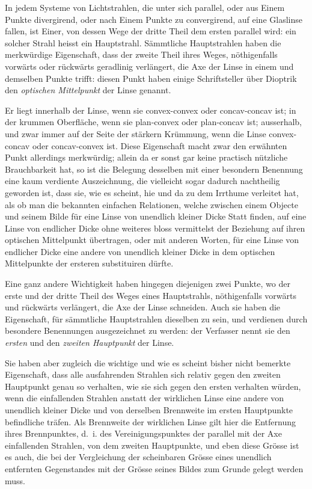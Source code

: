 \documentclass[12pt,a4paper]{article}
\begin{document}
In jedem Systeme von Lichtstrahlen, die unter sich parallel, oder aus Einem Punkte divergirend, oder nach Einem Punkte zu convergirend, auf eine Glaslinse fallen, ist Einer, von dessen Wege der dritte Theil dem ersten parallel wird: ein solcher Strahl heisst ein Hauptstrahl. Sämmtliche Hauptstrahlen haben die merkwürdige Eigenschaft, dass der zweite Theil ihres Weges, nöthigenfalls vorwärts oder rückwärts geradlinig verlängert, die Axe der Linse in einem und demselben Punkte trifft: diesen Punkt haben einige Schriftsteller über Dioptrik den \textit{optischen Mittelpunkt} der Linse genannt.

Er liegt innerhalb der Linse, wenn sie convex-convex oder concav-concav ist; in der krummen Oberfläche, wenn sie plan-convex oder plan-concav ist; ausserhalb, und zwar immer auf der Seite der stärkern Krümmung, wenn die Linse convex-concav oder concav-convex ist. Diese Eigenschaft macht zwar den erwähnten Punkt allerdings merkwürdig; allein da er sonst gar keine practisch nützliche Brauchbarkeit hat, so ist die Belegung desselben mit einer besondern Benennung eine kaum verdiente Auszeichnung, die vielleicht sogar dadurch nachtheilig geworden ist, dass sie, wie es scheint, hie und da zu dem Irrthume verleitet hat, als ob man die bekannten einfachen Relationen, welche zwischen einem Objecte und seinem Bilde für eine Linse von unendlich kleiner Dicke Statt finden, auf eine Linse von endlicher Dicke ohne weiteres bloss vermittelst der Beziehung auf ihren optischen Mittelpunkt übertragen, oder mit anderen Worten, für eine Linse von endlicher Dicke eine andere von unendlich kleiner Dicke in dem optischen Mittelpunkte der ersteren substituiren dürfte.

Eine ganz andere Wichtigkeit haben hingegen diejenigen zwei Punkte, wo der erste und der dritte Theil des Weges eines Hauptstrahls, nöthigenfalls vorwärts und rückwärts verlängert, die Axe der Linse schneiden. Auch sie haben die Eigenschaft, für sämmtliche Hauptstrahlen dieselben zu sein, und verdienen durch besondere Benennungen ausgezeichnet zu werden: der Verfasser nennt sie den \textit{ersten} und den \textit{zweiten Hauptpunkt} der Linse.

Sie haben aber zugleich die wichtige und wie es scheint bisher nicht bemerkte Eigenschaft, dass alle ausfahrenden Strahlen sich relativ gegen den zweiten Hauptpunkt genau so verhalten, wie sie sich gegen den ersten verhalten würden, wenn die einfallenden Strahlen anstatt der wirklichen Linse eine andere von unendlich kleiner Dicke und von derselben Brennweite im ersten Hauptpunkte befindliche träfen. Als Brennweite der wirklichen Linse gilt hier die Entfernung ihres Brennpunktes, d.~i. des Vereinigungspunktes der parallel mit der Axe einfallenden Strahlen, von dem zweiten Hauptpunkte, und eben diese Grösse ist es auch, die bei der Vergleichung der scheinbaren Grösse eines unendlich entfernten Gegenstandes mit der Grösse seines Bildes zum Grunde gelegt werden muss.
\end{document}
